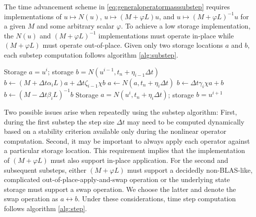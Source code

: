 \documentclass[letterpaper,11pt,nointlimits,reqno]{amsart}
\begin{document}
The time advancement scheme in \eqref{eq:generaloperatormasssubstep} requires
implementations of $u\mapsto{}{N}\left(u\right)$,
$u\mapsto{}\left(M+\varphi{}L\right)u$, and
$u\mapsto{}\left(M+\varphi{}L\right)^{-1}u$ for a given $M$ and some arbitrary
scalar $\varphi$.  To achieve a low storage implementation, the
$N\left(u\right)$ and $\left(M+\varphi{}L\right)^{-1}$ implementations must
operate in-place while $\left(M+\varphi{}L\right)$ must operate out-of-place.
Given only two storage locations $a$ and $b$, each substep computation follows
algorithm \vref{alg:substep}.

\begin{algorithm}
\label{alg:substep}
\caption{Compute one substep in the SMR scheme following
         equation (\ref{eq:generaloperatormasssubstep}) %
         }
\begin{algorithmic}
  \REQUIRE Storage $a = u^i$;
           storage $b = N\left(u^{i-1},t_{n}+\eta_{i-1}\Delta{}t\right)$
  \STATE $b\leftarrow{}   \left(M+\Delta{}t\alpha_{i}L\right)a
                        + \Delta{}t\zeta_{i-1}\chi{}b$
  \STATE $a\leftarrow{}N\left(a,t_{n}+\eta_{i}\Delta{}t\right)$
  \STATE $b\leftarrow{}\Delta{}t\gamma_{i}\chi{}a + b$
  \STATE $b\leftarrow{}\left(M-\Delta{}t\beta_{i}L\right)^{-1}b$
  \ENSURE Storage $a = N\left(u^{i},t_{n}+\eta_{i}\Delta{}t\right)$;
          storage $b = u^{i+1}$
\end{algorithmic}
\end{algorithm}

Two possible issues arise when repeatedly using the substep algorithm: First,
during the first substep the step size $\Delta{}t$ may need to be computed
dynamically based on a stability criterion available only during the nonlinear
operator computation.  Second, it may be important to always apply each
operator against a particular storage location.  This requirement implies that
the implementation of $\left(M+\varphi{}L\right)$ must also support in-place
application.  For the second and subsequent substeps, either
$\left(M+\varphi{}L\right)$ must support a decidedly non-BLAS-like, complicated
out-of-place-apply-and-swap operation or the underlying state storage must
support a swap operation.  We choose the latter and denote the swap operation
as $a\leftrightarrow{}b$.  Under these considerations, time step computation
follows algorithm \vref{alg:step}.
\end{document}
